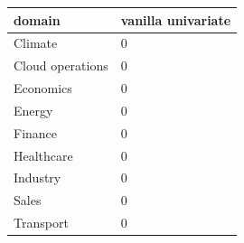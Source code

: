 \begin{tabular}{ll}
\toprule
domain & vanilla univariate \\
\midrule
Climate & 0 \\
Cloud operations & 0 \\
Economics & 0 \\
Energy & 0 \\
Finance & 0 \\
Healthcare & 0 \\
Industry & 0 \\
Sales & 0 \\
Transport & 0 \\
\bottomrule
\end{tabular}

